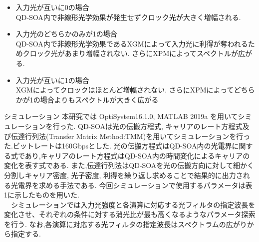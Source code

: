 \documentclass[dvipdfmx]{ujarticle}
\makeatletter
\def\section{\@startsection{section}{1}{\z@}
   {0.8\Cvs \@plus.5\Cdp \@minus.2\Cdp}
   {0.2\Cvs \@plus.3\Cdp}
   {\normalfont \Large \bfseries}}
\def\section{\@startsection{section}{1}{\z@}
   {0.8\Cvs \@plus.5\Cdp \@minus.2\Cdp}
   {0.2\Cvs \@plus.3\Cdp}
   {\normalfont \Large \bfseries}}
\makeatother
\begin{document}
    \begin{itemize}
      \item 入力光が互いに0の場合 \\
      QD-SOA内で非線形光学効果が発生せずクロック光が大きく増幅される.
      \item 入力光のどちらかのみが1の場合 \\
      QD-SOA内で非線形光学効果であるXGMによって入力光に利得が奪われるためクロック光があまり増幅されない.
      さらにXPMによってスペクトルが広がる.
      \item 入力光が互いに1の場合 \\
      XGMによってクロックはほとんど増幅されない.
      さらにXPMによってどちらかが1の場合よりもスペクトルが大きく広がる
    \end{itemize}

\section{シミュレーション}
    本研究では OptiSystem16.1.0, MATLAB 2019a を用いてシミュレーションを行った.
    QD-SOAは光の伝搬方程式, キャリアのレート方程式及び伝達行列法(Transfer Matrix Method:TMM)を用いてシミュレーションを行った.ビットレートは160Gbpsとした.
    光の伝搬方程式はQD-SOA内の光電界に関する式であり,キャリアのレート方程式はQD-SOA内の時間変化によるキャリアの変化を表す式である.
    また,伝達行列法はQD-SOAを光の伝搬方向に対して細かく分割しキャリア密度, 光子密度, 利得を繰り返し求めることで結果的に出力される光電界を求める手法である.
    今回シミュレーションで使用するパラメータは表1に示したものを用いた.\\
    　シミュレーションでは入力光強度と各演算に対応する光フィルタの指定波長を変化させ、それぞれの条件に対する消光比が最も高くなるようなパラメータ探索を行う.
    なお,各演算に対応する光フィルタの指定波長はスペクトラムの広がりから指定する.
\end{document}
